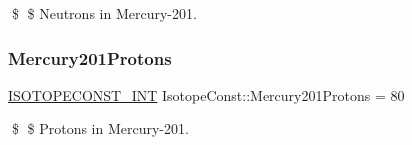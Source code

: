\$ \$ Neutrons in Mercury-\/201. \mbox{\label{group___isotope_const-_mercury-_hg201_gaa08b0d298f95a8ba6aec3cc977f46541}} 
\subsubsection{\texorpdfstring{Mercury201\+Protons}{Mercury201Protons}}
{\footnotesize\ttfamily \mbox{\hyperlink{group___isotope_const-_macros_ga5f18360b3e99483a35c32d789e62621c}{I\+S\+O\+T\+O\+P\+E\+C\+O\+N\+S\+T\+\_\+\+I\+NT}} Isotope\+Const\+::\+Mercury201\+Protons = 80}

\$ \$ Protons in Mercury-\/201. 